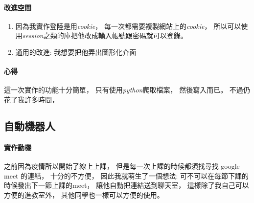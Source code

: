 \documentclass[12pt]{ctexart}
\begin{document}

\clearpage
\paragraph{改進空間}
\begin{enumerate}
    \item 
        因為我實作登陸是用\textit{cookie}，
        每一次都需要複製網站上的\textit{cookie}，
        所以可以使用\textit{session}之類的庫把他改成輸入帳號跟密碼就可以登錄。
    \item 
        通用的改進: 我想要把他弄出圖形化介面
\end{enumerate}

\paragraph{心得}
\begin{adjustwidth}{2em}{0em}
    這一次實作的功能十分簡單，
    只有使用\textit{python}爬取檔案，
    然後寫入而已。
    不過仍花了我許多時間，
\end{adjustwidth}


\clearpage

\subsection{ 自動機器人 }


\paragraph{ 實作動機 }
\begin{adjustwidth}{2em}{0em}
    之前因為疫情所以開始了線上上課，
    但是每一次上課的時候都須找尋找 google meet 的連結，
    十分的不方便，
    因此我就萌生了一個想法:
    可不可以在每節下課的時候發出下一節上課的meet，
    讓他自動把連結送到聊天室，
    這樣除了我自己可以方便的進教室外，
    其他同學也一樣可以方便的使用。
\end{adjustwidth}
\end{document}
